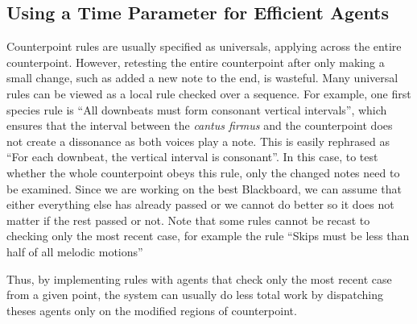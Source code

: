 \subsection{Using a Time Parameter for Efficient Agents}
Counterpoint rules are usually specified as universals, applying across the entire counterpoint.
However, retesting the entire counterpoint after only making a small change, such as added a new note to the end, is wasteful.
Many universal rules can be viewed as a local rule checked over a sequence.
For example, one first species rule is ``All downbeats must form consonant vertical intervals'', 
  which ensures that the interval between the \emph{cantus firmus} and the counterpoint does not create a dissonance as both voices play a note.
This is easily rephrased as ``For each downbeat, the vertical interval is consonant''.
In this case, to test whether the whole counterpoint obeys this rule, only the changed notes need to be examined.
Since we are working on the best Blackboard, we can assume that either everything else has already passed or 
  we cannot do better so it does not matter if the rest passed or not.
Note that some rules cannot be recast to checking only the most recent case, for example the rule ``Skips must be less than half of all melodic motions''

Thus, by implementing rules with agents that check only the most recent case from a given point, 
the system can usually do less total work by dispatching theses agents only on the modified regions of counterpoint.


